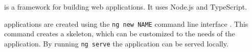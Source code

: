 \section{\angular{}}\label{sec:FE_angular}

\angular{} is a framework for building web applications.
It uses Node.js and TypeScript.

\angular{} applications are created using the \texttt{ng new NAME} command line interface \cite{angular_book2018}.
This command creates a skeleton, which can be customized to the needs of the application.
By running \texttt{ng serve} the application can be served locally.